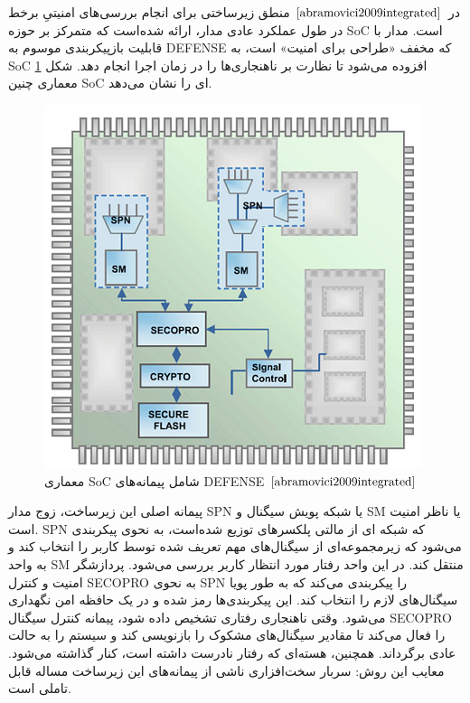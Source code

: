 در $\cite{abramovici2009integrated}$ منطق زیرساختی برای انجام بررسی‌های امنیتیِ برخط در طول عملکرد عادی مدار، ارائه شده‌است که متمرکز بر حوزه SoC است. مدار با قابلیت بازپیکربندی موسوم به DEFENSE که مخفف «طراحی برای امنیت» است، به SoC افزوده می‌شود تا نظارت بر ناهنجاری‌ها را در زمان اجرا انجام دهد. شکل \ref{fig6-5} معماری چنین SoC ای را نشان می‌دهد.
\begin{figure}
	\begin{center}
		\includegraphics[scale=0.6]{figs/fig6-5.png}
		\caption[معماری SoC شامل پیمانه‌های DEFENSE]
		{معماری SoC شامل پیمانه‌های DEFENSE
			$\cite{abramovici2009integrated}$}
		\label{fig6-5}
	\end{center}
\end{figure} 
پیمانه اصلی این زیرساخت، زوج مدار SPN یا شبکه پویش سیگنال و SM یا ناظر امنیت است. SPN که شبکه ای از مالتی پلکسرهای توزیع شده‌است، به نحوی پیکربندی می‌شود که زیرمجموعه‌ای از سیگنال‌های مهم تعریف شده توسط کاربر را انتخاب کند و به واحد SM منتقل کند. در این واحد رفتار مورد انتظار کاربر بررسی می‌شود. پردازشگر امنیت و کنترل SECOPRO به نحوی SPN را پیکربندی می‌کند که به طور پویا سیگنال‌های لازم را انتخاب کند. این پیکربندی‌ها رمز شده و در یک حافظه امن نگهداری می‌شود. وقتی ناهنجاری رفتاری تشخیص داده شود، پیمانه کنترل سیگنال SECOPRO را فعال می‌کند تا مقادیر سیگنال‌های مشکوک را بازنویسی کند و سیستم را به حالت عادی برگرداند. همچنین، هسته‌ای که رفتار نادرست داشته است، کنار گذاشته می‌شود. 
معایب این روش:
سربار سخت‌افزاری ناشی از پیمانه‌های این زیرساخت مساله قابل تاملی است.
